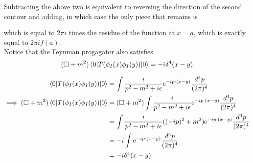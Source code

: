 \documentclass[11pt]{article}
\newcommand{\e}{\mathrm{e}}
\numberwithin{equation}{section}
\begin{document}
    Subtracting the above two is equivalent to reversing the direction of the second contour and adding, in which case the only piece that remains is 
    \begin{figure}[h]
        \centering
    \end{figure}

    which is equal to \(2\pi i\) times the residue of the function at \(x=a\), which is exactly equal to \(2\pi i f(a)\).\\

    Notice that the Feynman progagator also satisfies 
    \begin{equation*}
        (\square + m^2) \braket{0|T(\phi_I(x) \phi_I(y))|0} = -i\delta^4(x-y)
    \end{equation*}

    \textcolor{red}{
        \begin{align*}
                \braket{0|T(\phi_I(x) \phi_I(y))|0} &= \int\frac{i}{p^2 - m^2 + i\epsilon} \e^{-ip\cdot(x-y)}\frac{d^4p}{(2\pi)^4} \\
                \implies (\square + m^2) \braket{0|T(\phi_I(x) \phi_I(y))|0} &= (\square + m^2) \int\frac{i}{p^2 - m^2 + i\epsilon} \e^{-ip\cdot(x-y)}\frac{d^4p}{(2\pi)^4} \\
                &= \int \frac{i}{p^2 - m^2 + i\epsilon} ((-ip)^2 + m^2) \e^{-ip\cdot(x-y)}\frac{d^4p}{(2\pi)^4}\\
                &= -i \int \e^{-ip\cdot(x-y)}\frac{d^4p}{(2\pi)^4}\\
                &= -i\delta^4(x-y)
        \end{align*}
    }
    
\end{document}
